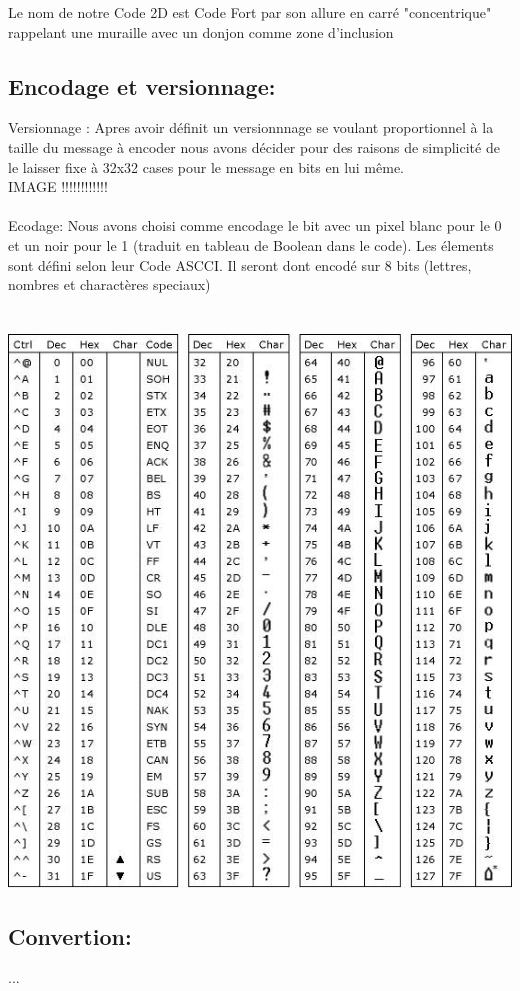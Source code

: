 \documentclass{article}
\begin{document}
Le nom de notre Code 2D est Code Fort par son allure en carré "concentrique" rappelant une muraille avec un donjon comme zone d'inclusion  
\subsection{Encodage et versionnage:}
Versionnage :
Apres avoir définit un versionnnage se voulant proportionnel à la taille du message à encoder nous avons décider pour des raisons de simplicité de le laisser fixe à 32x32 cases pour le message en bits en lui même.\\
IMAGE !!!!!!!!!!!!\\
\\
Ecodage:
Nous avons choisi comme encodage le bit avec un pixel blanc pour le 0 et un noir pour le 1 (traduit en tableau de Boolean dans le code). Les élements sont défini selon leur Code ASCCI. Il seront dont encodé sur 8 bits (lettres, nombres et charactères speciaux)
\\\\\\
\includegraphics[scale=0.6]{code_ascii_1.jpg} 
\\
\subsection{Convertion:}
...
\\
\end{document}
